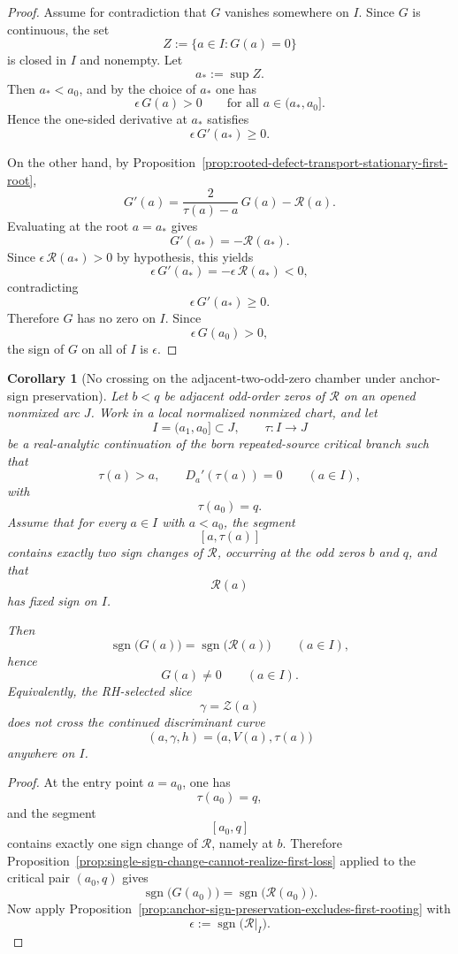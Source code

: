 \documentclass[11pt,a4paper]{amsart}
\theoremstyle{plain}
\newtheorem{corollary}[theorem]{Corollary}
\theoremstyle{definition}
\begin{document}
\begin{proof}
Assume for contradiction that $G$ vanishes somewhere on $I$. Since $G$ is
continuous, the set
\[
Z:=\{a\in I:G(a)=0\}
\]
is closed in $I$ and nonempty. Let
\[
a_*:=\sup Z.
\]
Then $a_*<a_0$, and by the choice of $a_*$ one has
\[
\epsilon\,G(a)>0
\qquad\text{for all }a\in(a_*,a_0].
\]
Hence the one-sided derivative at $a_*$ satisfies
\[
\epsilon\,G'(a_*)\ge 0.
\]

On the other hand, by
Proposition~\ref{prop:rooted-defect-transport-stationary-first-root},
\[
G'(a)=\frac{2}{\tau(a)-a}\,G(a)-\mathcal R(a).
\]
Evaluating at the root $a=a_*$ gives
\[
G'(a_*)=-\mathcal R(a_*).
\]
Since $\epsilon\,\mathcal R(a_*)>0$ by hypothesis, this yields
\[
\epsilon\,G'(a_*)
=
-\epsilon\,\mathcal R(a_*)
<0,
\]
contradicting
\[
\epsilon\,G'(a_*)\ge 0.
\]
Therefore $G$ has no zero on $I$. Since
\[
\epsilon\,G(a_0)>0,
\]
the sign of $G$ on all of $I$ is $\epsilon$.
\end{proof}

\begin{corollary}[No crossing on the adjacent-two-odd-zero chamber under anchor-sign preservation]
\label{cor:no-crossing-adjacent-two-odd-zero-under-anchor-sign-preservation}
Let $b<q$ be adjacent odd-order zeros of $\mathcal R$ on an opened nonmixed
arc $J$. Work in a local normalized nonmixed chart, and let
\[
I=(a_1,a_0]\subset J,
\qquad
\tau:I\to J
\]
be a real-analytic continuation of the born repeated-source critical branch such
that
\[
\tau(a)>a,
\qquad
D_a'(\tau(a))=0
\qquad (a\in I),
\]
with
\[
\tau(a_0)=q.
\]
Assume that for every $a\in I$ with $a<a_0$, the segment
\[
[a,\tau(a)]
\]
contains exactly two sign changes of $\mathcal R$, occurring at the odd zeros
$b$ and $q$, and that
\[
\mathcal R(a)
\]
has fixed sign on $I$.

Then
\[
\operatorname{sgn}\bigl(G(a)\bigr)=\operatorname{sgn}\bigl(\mathcal R(a)\bigr)
\qquad (a\in I),
\]
hence
\[
G(a)\neq 0
\qquad (a\in I).
\]
Equivalently, the RH-selected slice
\[
\gamma=\mathcal Z(a)
\]
does not cross the continued discriminant curve
\[
(a,\gamma,h)=\bigl(a,V(a),\tau(a)\bigr)
\]
anywhere on $I$.
\end{corollary}

\begin{proof}
At the entry point $a=a_0$, one has
\[
\tau(a_0)=q,
\]
and the segment
\[
[a_0,q]
\]
contains exactly one sign change of $\mathcal R$, namely at $b$. Therefore
Proposition~\ref{prop:single-sign-change-cannot-realize-first-loss} applied to
the critical pair $(a_0,q)$ gives
\[
\operatorname{sgn}\bigl(G(a_0)\bigr)
=
\operatorname{sgn}\bigl(\mathcal R(a_0)\bigr).
\]
Now apply
Proposition~\ref{prop:anchor-sign-preservation-excludes-first-rooting}
with
\[
\epsilon:=\operatorname{sgn}\bigl(\mathcal R|_I\bigr).
\]
\end{proof}
\end{document}
